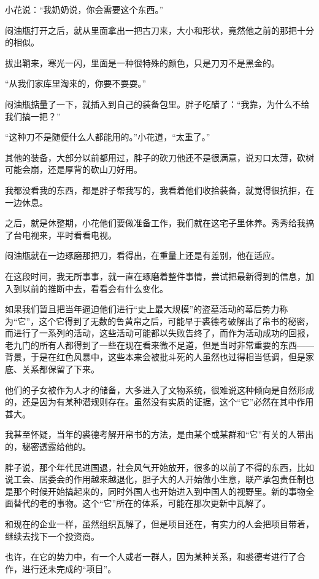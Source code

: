 小花说：“我奶奶说，你会需要这个东西。”

闷油瓶打开之后，就从里面拿出一把古刀来，大小和形状，竟然他之前的那把十分的相似。

拔出鞘来，寒光一闪，里面是一种很特殊的颜色，只是刀刃不是黑金的。

“从我们家库里淘来的，你要不耍耍。”

闷油瓶掂量了一下，就插入到自己的装备包里。胖子吃醋了：“我靠，为什么不给我们搞一把？”

“这种刀不是随便什么人都能用的。”小花道，“太重了。”

其他的装备，大部分以前都用过，胖子的砍刀他还不是很满意，说刃口太薄，砍树可能会崩，还是厚背的砍山刀好用。

我都没看我的东西，都是胖子帮我写的，我看着他们收拾装备，就觉得很抗拒，在一边休息。

之后，就是休整期，小花他们要做准备工作，我们就在这宅子里休养。秀秀给我搞了台电视来，平时看看电视。

闷油瓶就在一边琢磨那把刀，看得出，在重量上还是有差别，他在适应。

在这段时间，我无所事事，就一直在琢磨着整件事情，尝试把最新得到的信息，加入到以前的推断中去，看看会有什么变化。

如果我们暂且把当年逼迫他们进行“史上最大规模”的盗墓活动的幕后势力称为“它”，这个它得到了无数的鲁黄帛之后，可能早于裘德考破解出了帛书的秘密，而进行了一系列的活动，这些活动可能都以失败告终了，而作为活动成功的回报，老九门的所有人都得到了一些在现在看来微不足道，但是当时非常重要的东西——背景，于是在红色风暴中，这些本来会被批斗死的人虽然也过得相当低调，但是家底、关系都保留了下来。

他们的子女被作为人才的储备，大多进入了文物系统，很难说这种倾向是自然形成的，还是因为有某种潜规则存在。虽然没有实质的证据，这个“它”必然在其中作用甚大。

我甚至怀疑，当年的裘德考解开帛书的方法，是由某个或某群和“它”有关的人带出的，秘密透露给他的。

胖子说，那个年代民进国退，社会风气开始放开，很多的以前了不得的东西，比如说工会、居委会的作用越来越退化，胆子大的人开始做小生意，联产承包责任制也是那个时候开始搞起来的，同时外国人也开始进入到中国人的视野里。新的事物全面替代的老的事物。这个“它”所在的体系，可能在那次更新中瓦解了。

和现在的企业一样，虽然组织瓦解了，但是项目还在，有实力的人会把项目带着，继续去找下一个投资商。

也许，在它的势力中，有一个人或者一群人，因为某种关系，和裘德考进行了合作，进行还未完成的“项目”。


